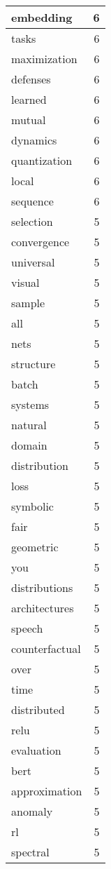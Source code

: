 \begin{table}[h]
\begin{tabular}{|l|r|}
\hline
embedding & 6 \\
\hline
tasks & 6 \\
\hline
maximization & 6 \\
\hline
defenses & 6 \\
\hline
learned & 6 \\
\hline
mutual & 6 \\
\hline
dynamics & 6 \\
\hline
quantization & 6 \\
\hline
local & 6 \\
\hline
sequence & 6 \\
\hline
selection & 5 \\
\hline
convergence & 5 \\
\hline
universal & 5 \\
\hline
visual & 5 \\
\hline
sample & 5 \\
\hline
all & 5 \\
\hline
nets & 5 \\
\hline
structure & 5 \\
\hline
batch & 5 \\
\hline
systems & 5 \\
\hline
natural & 5 \\
\hline
domain & 5 \\
\hline
distribution & 5 \\
\hline
loss & 5 \\
\hline
symbolic & 5 \\
\hline
fair & 5 \\
\hline
geometric & 5 \\
\hline
you & 5 \\
\hline
distributions & 5 \\
\hline
architectures & 5 \\
\hline
speech & 5 \\
\hline
counterfactual & 5 \\
\hline
over & 5 \\
\hline
time & 5 \\
\hline
distributed & 5 \\
\hline
relu & 5 \\
\hline
evaluation & 5 \\
\hline
bert & 5 \\
\hline
approximation & 5 \\
\hline
anomaly & 5 \\
\hline
rl & 5 \\
\hline
spectral & 5 \\

\end{tabular}
\end{table}
